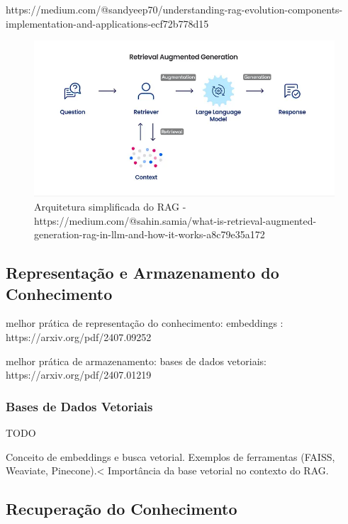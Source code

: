 https://medium.com/@sandyeep70/understanding-rag-evolution-components-implementation-and-applications-ecf72b778d15



\begin{figure}[H]
        \centering
        \includegraphics[width=1\linewidth]{ch2/assets/RAG-ach-2.png
        }
        \caption{Arquitetura simplificada do RAG - https://medium.com/@sahin.samia/what-is-retrieval-augmented-generation-rag-in-llm-and-how-it-works-a8c79e35a172}
        \label{fig:acrh-rag}
\end{figure}


\subsection{Representação e Armazenamento do Conhecimento}

melhor prática de representação do conhecimento: embeddings : https://arxiv.org/pdf/2407.09252

melhor prática de armazenamento: bases de dados vetoriais: https://arxiv.org/pdf/2407.01219


\subsubsection{Bases de Dados Vetoriais}

TODO

Conceito de embeddings e busca vetorial.
Exemplos de ferramentas (FAISS, Weaviate, Pinecone).<
Importância da base vetorial no contexto do RAG.




\subsection{Recuperação do Conhecimento}
\label{recu-context}

